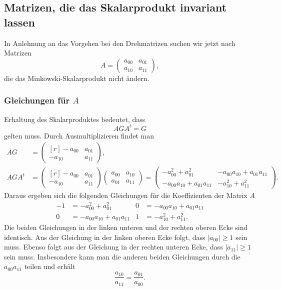 %
%
\subsection{Matrizen, die das Skalarprodukt invariant lassen}
In Anlehnung an das Vorgehen bei den Drehmatrizen suchen wir jetzt nach
Matrizen
\[
A
=
\begin{pmatrix}
a_{00}&a_{01}\\
a_{10}&a_{11}
\end{pmatrix}
,
\]
die das Minkowski-Skalarprodukt nicht ändern.

%
%
\subsubsection{Gleichungen für $A$}
Erhaltung des Skalarproduktes bedeutet, dass 
\[
AGA^t = G
\]
gelten muss.
Durch Ausmultiplizieren findet man
\begin{align*}
AG&=
\begin{pmatrix*}[r]
-a_{00}& a_{01}\\
-a_{10}& a_{11}
\end{pmatrix*},
\\
AGA^t
&=
\begin{pmatrix*}[r]
-a_{00}& a_{01}\\
-a_{10}& a_{11}
\end{pmatrix*}
\begin{pmatrix}
a_{00}&a_{10}\\
a_{01}&a_{11}
\end{pmatrix}
=
\begin{pmatrix}
-a_{00}^2+a_{01}^2 & -a_{00}a_{10} +a_{01}a_{11} \\
-a_{00}a_{10} +a_{01}a_{11} & -a_{10}^2+a_{11}^2
\end{pmatrix}.
\end{align*}
Daraus ergeben sich die folgenden Gleichungen für die Koeffizienten
der Matrix $A$
\begin{align*}
-1 &= -a_{00}^2+a_{01}^2          & 0 &= -a_{00}a_{10} +a_{01}a_{11} \\
 0 &= -a_{00}a_{10} +a_{01}a_{11} & 1 &= -a_{10}^2+a_{11}^2.
\end{align*}
Die beiden Gleichungen in der linken unteren und der rechten oberen Ecke
sind identisch.
Aus der Gleichung in der linken oberen Ecke folgt, dass $|a_{00}|\ge 1$
sein muss.
Ebenso folgt aus der Gleichung in der rechten unteren Ecke, dass
$|a_{11}| \ge 1$ sein muss.
Insbesondere kann man die anderen beiden Gleichungen durch die 
$a_{00}a_{11}$ teilen und erhält
\begin{equation}
\frac{a_{10}}{a_{11}} = \frac{a_{01}}{a_{00}}.
\label{buch:geometrie:hyperbolisch:eqn:aaaa}
\end{equation}

